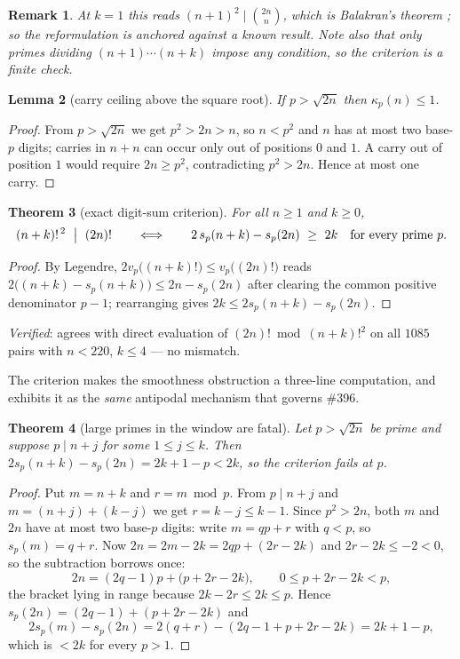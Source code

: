 \documentclass[11pt]{article}
\newtheorem{theorem}{Theorem}
\newtheorem{lemma}[theorem]{Lemma}
\newtheorem{remark}[theorem]{Remark}
\begin{document}
\begin{remark}
At $k=1$ this reads $(n+1)^2\mid\binom{2n}{n}$, which is Balakran's theorem \cite{Ba29};
so the reformulation is anchored against a known result.  Note also that only primes
dividing $(n{+}1)\cdots(n{+}k)$ impose any condition, so the criterion is a finite check.
\end{remark}

\begin{lemma}[carry ceiling above the square root]\label{lem:ceiling}
If $p>\sqrt{2n}$ then $\kappa_p(n)\le1$.
\end{lemma}

\begin{proof}
From $p>\sqrt{2n}$ we get $p^2>2n>n$, so $n<p^2$ and $n$ has at most two base-$p$ digits;
carries in $n+n$ can occur only out of positions $0$ and $1$.  A carry out of position $1$
would require $2n\ge p^2$, contradicting $p^2>2n$.  Hence at most one carry.
\end{proof}

\begin{theorem}[exact digit-sum criterion]\label{thm:727crit}
For all $n\ge1$ and $k\ge0$,
\[
  (n+k)!^{\,2}\ \bigm|\ (2n)!
  \qquad\Longleftrightarrow\qquad
  2\,s_p(n+k)-s_p(2n)\ \ge\ 2k\quad\text{for every prime }p .
\]
\end{theorem}

\begin{proof}
By Legendre, $2v_p\bigl((n+k)!\bigr)\le v_p\bigl((2n)!\bigr)$ reads
$2\bigl((n+k)-s_p(n+k)\bigr)\le 2n-s_p(2n)$ after clearing the common positive denominator
$p-1$; rearranging gives $2k\le 2s_p(n+k)-s_p(2n)$.
\end{proof}

\emph{Verified}: agrees with direct evaluation of $(2n)!\bmod (n+k)!^2$ on all $1085$ pairs
with $n<220$, $k\le4$ --- no mismatch.

The criterion makes the smoothness obstruction a three-line computation, and exhibits it as the
\emph{same} antipodal mechanism that governs \#396.

\begin{theorem}[large primes in the window are fatal]\label{thm:727window}
Let $p>\sqrt{2n}$ be prime and suppose $p\mid n+j$ for some $1\le j\le k$.  Then
$2s_p(n+k)-s_p(2n)=2k+1-p<2k$, so the criterion fails at $p$.
\end{theorem}

\begin{proof}
Put $m=n+k$ and $r=m\bmod p$.  From $p\mid n+j$ and $m=(n+j)+(k-j)$ we get $r=k-j\le k-1$.
Since $p^2>2n$, both $m$ and $2n$ have at most two base-$p$ digits: write $m=qp+r$ with
$q<p$, so $s_p(m)=q+r$.  Now $2n=2m-2k=2qp+(2r-2k)$ and $2r-2k\le-2<0$, so the subtraction
borrows once:
\[
  2n=(2q-1)p+\bigl(p+2r-2k\bigr),\qquad 0\le p+2r-2k<p,
\]
the bracket lying in range because $2k-2r\le 2k\le p$.  Hence
$s_p(2n)=(2q-1)+(p+2r-2k)$ and
\[
  2s_p(m)-s_p(2n)=2(q+r)-(2q-1+p+2r-2k)=2k+1-p ,
\]
which is $<2k$ for every $p>1$.
\end{proof}
\end{document}
